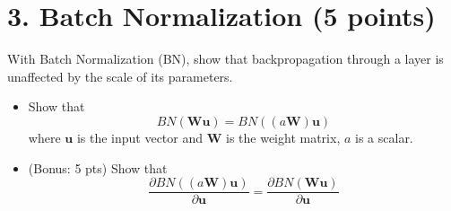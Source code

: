 \documentclass[12pt]{article}%
\begin{document}
\section*{3. Batch Normalization (5 points)}
With Batch Normalization (BN), show that backpropagation through a layer is unaffected by the scale of its parameters. 
\begin{itemize}
	\item Show that \[BN(\mathbf{Wu})=BN((a\mathbf{W})\mathbf{u})\] where $\mathbf{u}$ is the input vector and $\mathbf{W}$ is the weight matrix, $a$ is a scalar. 
	\item (Bonus: 5 pts) Show that 
	\[\frac{\partial BN((a\mathbf{W})\mathbf{u})}{\partial \mathbf{u}}=\frac{\partial BN(\mathbf{W}\mathbf{u})}{\partial \mathbf{u}}\]
\end{itemize}
\newpage



\newpage
\end{document}
